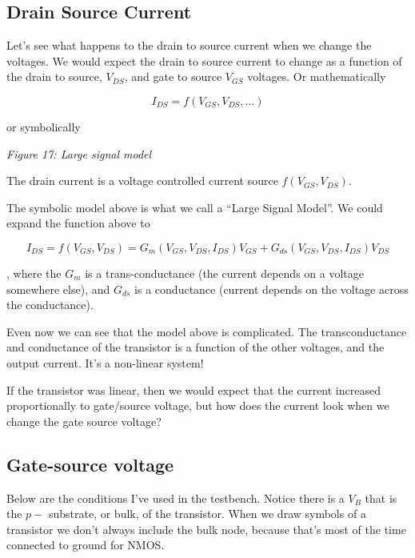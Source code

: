 \subsection{Drain Source Current}\label{drain-source-current}

Let's see what happens to the drain to source current when we change the
voltages. We would expect the drain to source current to change as a
function of the drain to source, \(V_{DS}\), and gate to source
\(V_{GS}\) voltages. Or mathematically

\[ I_{DS} = f(V_{GS},V_{DS},...) \]

or symbolically


{
\centering
{}
}

\emph{Figure 17: Large signal model}

The drain current is a voltage controlled current source
\(f(V_{GS},V_{DS})\).

The symbolic model above is what we call a ``Large Signal Model''. We
could expand the function above to

\[ I_{DS} = f(V_{GS},V_{DS}) = G_m(V_{GS},V_{DS},I_{DS}) V_{GS} + G_{ds}(V_{GS},V_{DS},I_{DS}) V_{DS} \]

, where the \(G_m\) is a trans-conductance (the current depends on a
voltage somewhere else), and \(G_{ds}\) is a conductance (current
depends on the voltage across the conductance).

Even now we can see that the model above is complicated. The
transconductance and conductance of the transistor is a function of the
other voltages, and the output current. It's a non-linear system!

If the transistor was linear, then we would expect that the current
increased proportionally to gate/source voltage, but how does the
current look when we change the gate source voltage?

\subsection{Gate-source voltage}\label{gate-source-voltage}

Below are the conditions I've used in the testbench. Notice there is a
\(V_{B}\) that is the \(p-\) substrate, or bulk, of the transistor. When
we draw symbols of a transistor we don't always include the bulk node,
because that's most of the time connected to ground for NMOS.

